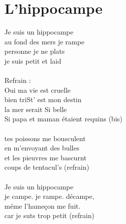 \section*{L'hippocampe}
Je suis un hippocampe\\
au fond des mers je rampe\\
personne je ne plats\\
je suis petit et laid\\\\
Refrain :\\
Oui ma vie est cruelle\\
bien triSt' est mon destin\\
la mer serait Si belle\\
Si papa et maman étaient requins (bis)\\\\
tes poissons me bousculent\\
en m'envoyant des bulles\\
et les pieuvres me bascurnt\\
coups de tentacul's (refrain)\\\\
Je suis un hippocampe\\
je campe. je rampe. décampe,\\
méme l'hameçon me fuit.\\
car je suts trop petit (refrain)\\\\
